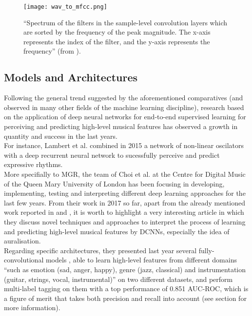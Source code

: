 \begin{figure}[h]
  \centering
  \texttt{[image: wav\_to\_mfcc.png]}
  \caption{``Spectrum of the filters in the sample-level convolution layers which are sorted by the frequency of the peak magnitude. The x-axis represents the index of the filter, and the y-axis represents the frequency'' (from \cite{wavdeep}).}
  \label{fig:wav-to-mfcc}
\end{figure}



\subsection{Models and Architectures}

Following the general trend suggested by the aforementioned comparatives (and observed in many other fields of the machine learning discipline), research based on the application of deep neural networks for end-to-end supervised learning for perceiving and predicting high-level musical features has observed a growth in quantity and success in the last years.\\

For instance, Lambert et al. combined in 2015 a network of non-linear oscilators with a deep recurrent neural network to sucessfully perceive and predict expressive rhythms\cite{expressive-rhyt}.\\

More specifially to MGR, the team of Choi et al. at the Centre for Digital Music of the Queen Mary University of London has been focusing in developing, implementing, testing and interpreting different deep learning approaches for the last few years. From their work in 2017 so far, apart from the already mentioned work reported in \cite{convtransfer} and \cite{choi-robustness}, it is worth to highlight a very interesting article in which they discuss novel techniques and approaches to interpret the process of learning and predicting high-level musical features by DCNNs\cite{choi-explaining}, especially the idea of auralisation.\\

Regarding specific architectures, they presented last year several fully-convolutional models \cite{choi-fcn}, able to learn high-level features from different domains ``such as emotion (sad, anger, happy), genre (jazz, classical) and instrumentation (guitar, strings, vocal, instrumental)'' on two different datasets, and perform multi-label tagging on them with a top performance of 0.851 AUC-ROC, which is a figure of merit that takes both precision and recall into account (see section \label{errormetrics} for more information).\\

